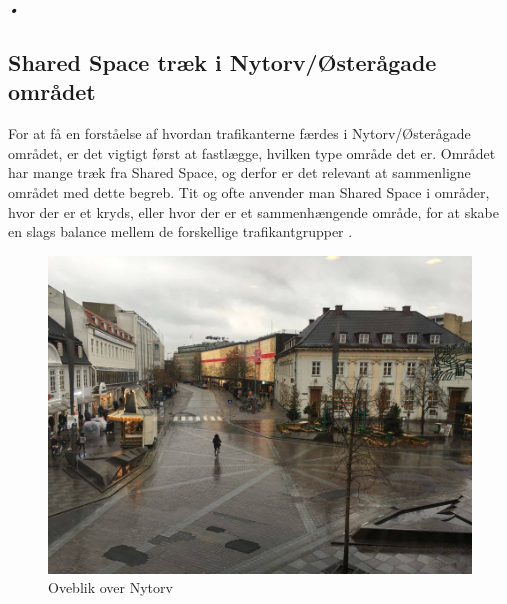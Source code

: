 \emph{•}\subsection{Shared Space træk i Nytorv/Østerågade området}
\label{omrade_sharedspace}
For at få en forståelse af hvordan trafikanterne færdes i Nytorv/Østerågade området, er det vigtigt først at fastlægge, hvilken type område det er. Området har mange træk fra Shared Space, og derfor er det relevant at sammenligne området med dette begreb.
Tit og ofte anvender man Shared Space i områder, hvor der er et kryds, eller hvor der er et sammenhængende område, for at skabe en slags balance mellem de forskellige trafikantgrupper \autocite{reglershared}.

\begin{figure}[htbp]
   \centering
   \begin{adjustbox}{max width=\textwidth}
     \includegraphics[scale=0.3]{figures/Billederogfigur/Nytorvoverblik.jpg}
  \end{adjustbox}
   \caption{Oveblik over Nytorv}
   \label{fig:nytorv}
 \end{figure}

